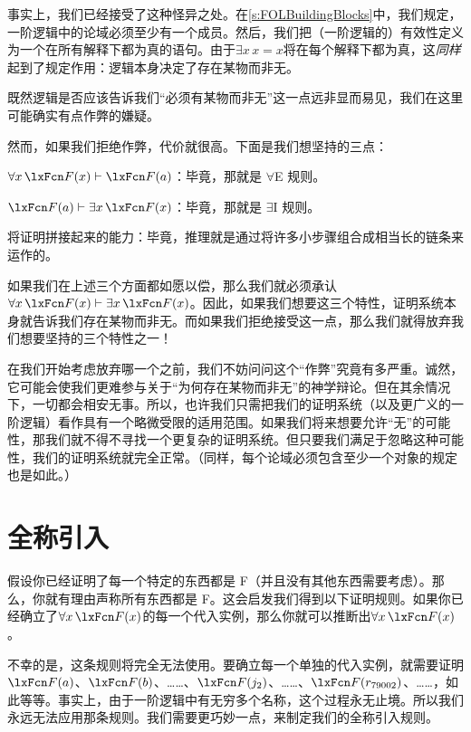 事实上，我们已经接受了这种怪异之处。在\cref{s:FOLBuildingBlocks}中，我们规定，一阶逻辑中的论域必须至少有一个成员。然后，我们把（一阶逻辑的）有效性定义为一个在所有解释下都为真的语句。由于$\exists x\, x=x$将在每个解释下都为真，这\emph{同样}起到了规定作用：逻辑本身决定了存在某物而非无。

既然逻辑是否应该告诉我们“必须有某物而非无”这一点远非显而易见，我们在这里可能确实有点作弊的嫌疑。

然而，如果我们拒绝作弊，代价就很高。下面是我们想坚持的三点：


\begin{compactlist}
		\item $\forall x\,\atom{F}{x} \proves \atom{F}{a}$：毕竟，那就是 $\forall$E 规则。
		\item $\atom{F}{a} \proves \exists x\,\atom{F}{x}$：毕竟，那就是 $\exists$I 规则。
		\item 将证明拼接起来的能力：毕竟，推理就是通过将许多小步骤组合成相当长的链条来运作的。
	\end{compactlist}


如果我们在上述三个方面都如愿以偿，那么我们就必须承认$\forall x\,\atom{F}{x} \proves \exists x\,\atom{F}{x}$。因此，如果我们想要这三个特性，证明系统本身就告诉我们存在某物而非无。而如果我们拒绝接受这一点，那么我们就得放弃我们想要坚持的三个特性之一！

在我们开始考虑放弃哪一个之前，我们不妨问问这个“作弊”究竟有多严重。诚然，它可能会使我们更难参与关于“为何存在某物而非无”的神学辩论。但在其余情况下，一切都会相安无事。所以，也许我们只需把我们的证明系统（以及更广义的一阶逻辑）看作具有一个略微受限的适用范围。如果我们将来想要允许“无”的可能性，那我们就不得不寻找一个更复杂的证明系统。但只要我们满足于忽略这种可能性，我们的证明系统就完全正常。（同样，每个论域必须包含至少一个对象的规定也是如此。）

\section{全称引入}\label{s:forallIntro}

假设你已经证明了每一个特定的东西都是 F（并且没有其他东西需要考虑）。那么，你就有理由声称所有东西都是 F。这会启发我们得到以下证明规则。如果你已经确立了$\forall x\,\atom{F}{x}$的每一个代入实例，那么你就可以推断出$\forall x\,\atom{F}{x}$。

不幸的是，这条规则将完全无法使用。要确立每一个单独的代入实例，就需要证明$\atom{F}{a}$、$\atom{F}{b}$、……、$\atom{F}{j_2}$、……、$\atom{F}{r_{79002}}$、……，如此等等。事实上，由于一阶逻辑中有无穷多个名称，这个过程永无止境。所以我们永远无法应用那条规则。我们需要更巧妙一点，来制定我们的全称引入规则。

